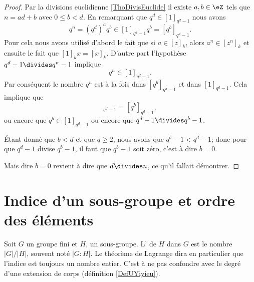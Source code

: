 \begin{proof}
    Par la divisions euclidienne \ref{ThoDivisEuclide} il existe \( a,b\in \eZ\) tels que \( n=ad+b\) avec \( 0\leq b<d\). En remarquant que \( q^d\in[1]_{q^d-1}\) nous avons
    \begin{equation}
        q^n=(q^d)^aq^b\in[1]_{q^d-1}q^b=[q^b]_{q^d-1}.
    \end{equation}
    Pour cela nous avons utilisé d'abord le fait que si \( a\in [z]_k\), alors \( a^n\in[z^n]_k\) et ensuite le fait que \( [1]_kx=[x]_k\). D'autre part l'hypothèse \( q^d-1\divides q^n-1\) implique 
    \begin{equation}
        q^n\in[1]_{q^d-1}.
    \end{equation}
    Par conséquent le nombre \( q^n\) est à la fois dans \( [q^b]_{q^d-1}\) et dans \( [1]_{q^d-1}\). Cela implique que
    \begin{equation}
        [1]_{q^d-1}=[q^b]_{q^d-1},
    \end{equation}
    ou encore que \( q^b\in[1]_{q^d-1}\) ou encore que \( q^d-1\divides q^b-1\).

    Étant donné que \( b<d\) et que \( q\geq 2\), nous avons que \( q^b-1<q^d-1\); donc pour que \( q^d-1\) divise \( q^b-1\), il faut que \( q^b-1\) soit zéro, c'est à dire \( b=0\). 

    Mais dire \( b=0\) revient à dire que \( d\divides n\), ce qu'il fallait démontrer.
\end{proof}

\section{Indice d'un sous-groupe et ordre des éléments}

Soit \( G\) un groupe fini et \( H\), un sous-groupe. L' de \( H\) dans \( G\) est le nombre \( | G |/| H |\), souvent noté \( | G:H |\). Le théorème de Lagrange dira en particulier que l'indice est toujours un nombre entier. C'est à ne pas confondre avec le degré d'une extension de corps (définition \ref{DefUYiyieu}).


